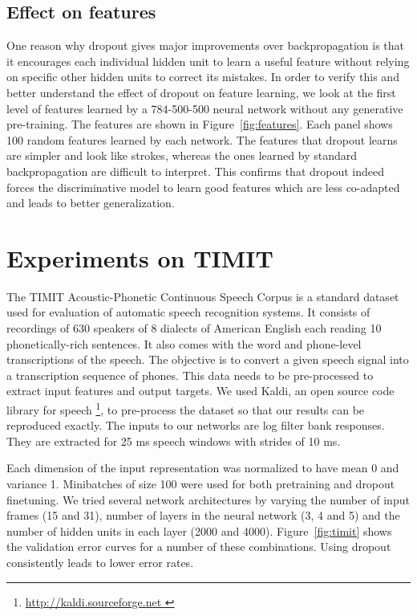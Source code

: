 \documentclass[12pt]{article}
\begin{document}
\subsection{Effect on features}
One reason why dropout gives major improvements over backpropagation is that it encourages each individual
hidden unit to learn a useful feature without relying on specific other hidden units to
correct its mistakes.  In order to verify this and better understand the effect
of dropout on feature learning, we look at the first level of features learned by a 784-500-500
neural network without any generative pre-training. The features are shown in Figure~\ref{fig:features}. Each panel shows 100 random
features learned by each network. The features that dropout
learns are simpler and look like strokes, whereas the ones learned by 
standard backpropagation are difficult to interpret. This
confirms that dropout indeed forces the discriminative model to learn
good features which are less co-adapted and leads to better generalization.



\section{Experiments on TIMIT}
\label{timitsom}
The TIMIT Acoustic-Phonetic Continuous Speech Corpus is a standard dataset used
for evaluation of automatic speech recognition systems. It consists of
recordings of 630 speakers of 8 dialects of American English each
reading 10 phonetically-rich sentences. It also comes with the word and
phone-level transcriptions of the speech. The objective is to convert a given 
speech signal into a transcription sequence of phones.
This data needs to be pre-processed to extract input features and output targets.
We used Kaldi, an open source code library for speech
\footnote{\url{ http://kaldi.sourceforge.net }}, to
pre-process the dataset so that our results can be reproduced exactly.
The inputs to our networks are log filter bank responses. They are extracted
for 25 ms speech windows with strides of 10 ms. 


Each dimension of the input representation was normalized to have mean 0 and variance 1.
Minibatches of size 100 were used for both pretraining and dropout finetuning. We
tried several network architectures by varying the number of input frames (15 and 31), number of
layers in the neural network (3, 4 and 5) and the number of hidden units in each
layer (2000 and 4000). 
Figure~\ref{fig:timit} shows the validation
error curves for a number of these combinations. Using dropout
consistently leads to lower error rates. 
\end{document}
